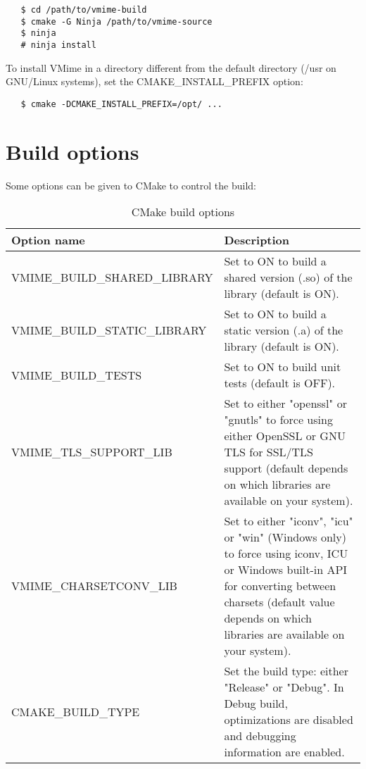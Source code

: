 \begin{verbatim}
   $ cd /path/to/vmime-build
   $ cmake -G Ninja /path/to/vmime-source
   $ ninja
   # ninja install
\end{verbatim}

To install VMime in a directory different from the default directory
({\vcode /usr} on GNU/Linux systems), set the
{\vcode CMAKE\_INSTALL\_PREFIX} option:

\begin{verbatim}
   $ cmake -DCMAKE_INSTALL_PREFIX=/opt/ ...
\end{verbatim}


\section{\label{build-options}Build options}

Some options can be given to CMake to control the build:

\begin{table}[!ht]
\noindent\begin{tabularx}{1.0\textwidth}{|l|X|}
\hline
	{\bf Option name} &
	{\bf Description} \\
\hline
\hline
VMIME\_BUILD\_SHARED\_LIBRARY &
Set to ON to build a shared version (.so) of the library (default is ON). \\
\hline
VMIME\_BUILD\_STATIC\_LIBRARY &
Set to ON to build a static version (.a) of the library (default is ON). \\
\hline
VMIME\_BUILD\_TESTS &
Set to ON to build unit tests (default is OFF). \\
\hline
VMIME\_TLS\_SUPPORT\_LIB &
Set to either "openssl" or "gnutls" to force using either OpenSSL or GNU TLS
for SSL/TLS support (default depends on which libraries are available on
your system). \\
\hline
VMIME\_CHARSETCONV\_LIB &
Set to either "iconv", "icu" or "win" (Windows only) to force using iconv, ICU
or Windows built-in API for converting between charsets (default value depends
on which libraries are available on your system). \\
\hline
CMAKE\_BUILD\_TYPE &
Set the build type: either "Release" or "Debug". In Debug build, optimizations
are disabled and debugging information are enabled. \\
\hline
\end{tabularx}
\caption{CMake build options}
\end{table}
